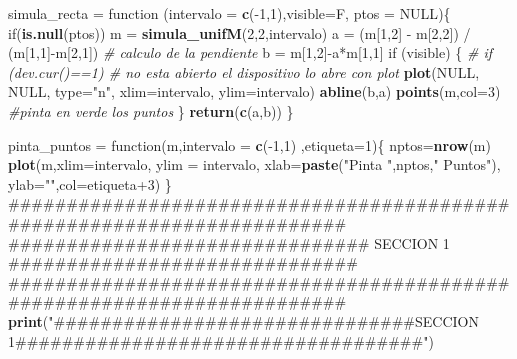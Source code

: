 \documentclass[]{article}
\newenvironment{Shaded}{\begin{snugshade}}{\end{snugshade}}
\newcommand{\KeywordTok}[1]{\textcolor[rgb]{0.13,0.29,0.53}{\textbf{{#1}}}}
\newcommand{\DataTypeTok}[1]{\textcolor[rgb]{0.13,0.29,0.53}{{#1}}}
\newcommand{\DecValTok}[1]{\textcolor[rgb]{0.00,0.00,0.81}{{#1}}}
\newcommand{\StringTok}[1]{\textcolor[rgb]{0.31,0.60,0.02}{{#1}}}
\newcommand{\CommentTok}[1]{\textcolor[rgb]{0.56,0.35,0.01}{\textit{{#1}}}}
\newcommand{\OtherTok}[1]{\textcolor[rgb]{0.56,0.35,0.01}{{#1}}}
\newcommand{\NormalTok}[1]{{#1}}
\begin{document}
\begin{Shaded}
\begin{Highlighting}[]
\NormalTok{simula_recta =}\StringTok{ }\NormalTok{function (}\DataTypeTok{intervalo =} \KeywordTok{c}\NormalTok{(-}\DecValTok{1}\NormalTok{,}\DecValTok{1}\NormalTok{),}\DataTypeTok{visible=}\NormalTok{F, }\DataTypeTok{ptos =} \OtherTok{NULL}\NormalTok{)\{}
  \NormalTok{if(}\KeywordTok{is.null}\NormalTok{(ptos)) m =}\StringTok{ }\KeywordTok{simula_unifM}\NormalTok{(}\DecValTok{2}\NormalTok{,}\DecValTok{2}\NormalTok{,intervalo)}
  \NormalTok{a =}\StringTok{ }\NormalTok{(m[}\DecValTok{1}\NormalTok{,}\DecValTok{2}\NormalTok{] -}\StringTok{ }\NormalTok{m[}\DecValTok{2}\NormalTok{,}\DecValTok{2}\NormalTok{]) /}\StringTok{ }\NormalTok{(m[}\DecValTok{1}\NormalTok{,}\DecValTok{1}\NormalTok{]-m[}\DecValTok{2}\NormalTok{,}\DecValTok{1}\NormalTok{]) }\CommentTok{# calculo de la pendiente}
  \NormalTok{b =}\StringTok{ }\NormalTok{m[}\DecValTok{1}\NormalTok{,}\DecValTok{2}\NormalTok{]-a*m[}\DecValTok{1}\NormalTok{,}\DecValTok{1}\NormalTok{]}
  \NormalTok{if (visible) \{}
  \CommentTok{#  if (dev.cur()==1) # no esta abierto el dispositivo lo abre con plot}
    \KeywordTok{plot}\NormalTok{(}\OtherTok{NULL}\NormalTok{, }\OtherTok{NULL}\NormalTok{, }\DataTypeTok{type=}\StringTok{"n"}\NormalTok{, }\DataTypeTok{xlim=}\NormalTok{intervalo, }\DataTypeTok{ylim=}\NormalTok{intervalo)}
    \KeywordTok{abline}\NormalTok{(b,a)}
    \KeywordTok{points}\NormalTok{(m,}\DataTypeTok{col=}\DecValTok{3}\NormalTok{) }\CommentTok{#pinta en verde los puntos}
  \NormalTok{\}}
  \KeywordTok{return}\NormalTok{(}\KeywordTok{c}\NormalTok{(a,b))}
\NormalTok{\}}

\NormalTok{pinta_puntos =}\StringTok{ }\NormalTok{function(m,}\DataTypeTok{intervalo =} \KeywordTok{c}\NormalTok{(-}\DecValTok{1}\NormalTok{,}\DecValTok{1}\NormalTok{) ,}\DataTypeTok{etiqueta=}\DecValTok{1}\NormalTok{)\{}
  \NormalTok{nptos=}\KeywordTok{nrow}\NormalTok{(m)}
  \KeywordTok{plot}\NormalTok{(m,}\DataTypeTok{xlim=}\NormalTok{intervalo, }\DataTypeTok{ylim =} \NormalTok{intervalo, }\DataTypeTok{xlab=}\KeywordTok{paste}\NormalTok{(}\StringTok{"Pinta "}\NormalTok{,nptos,}\StringTok{" Puntos"}\NormalTok{), }\DataTypeTok{ylab=}\StringTok{""}\NormalTok{,}\DataTypeTok{col=}\NormalTok{etiqueta}\DecValTok{+3}\NormalTok{)}
\NormalTok{\}}
\NormalTok{########################################################################}
\NormalTok{############################### SECCION 1 ##############################}
\NormalTok{########################################################################}
\KeywordTok{print}\NormalTok{(}\StringTok{"###############################SECCION 1###################################"}\NormalTok{)}
\end{Highlighting}
\end{Shaded}
\end{document}
